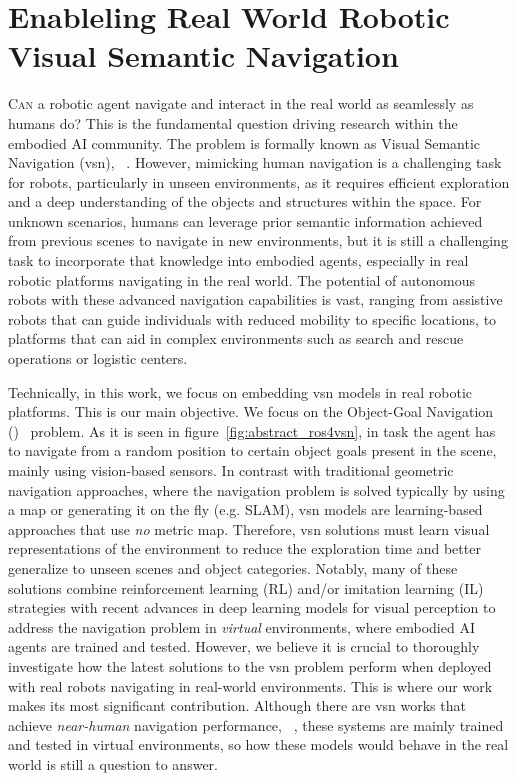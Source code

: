 \chapter{Enableling Real World Robotic Visual Semantic Navigation}\label{ch:ros4vsn:-enable-real-world-robotic-visual-semantic-navigation}

\lettrine{\textcolor{accent_color}{C}}{an} a robotic agent navigate and interact in the real world as seamlessly as humans do?
This is the fundamental question driving research within the embodied AI community.
The problem is formally known as Visual Semantic Navigation (\acrshort{vsn}), \eg~\cite{ramrakhya2023,Cai2024DGMemLV,chang2020}.
However, mimicking human navigation is a challenging task for robots, particularly in unseen environments, as it requires efficient exploration and a deep understanding of the objects and structures within the space.
For unknown scenarios, humans can leverage prior semantic information achieved from previous scenes to navigate in new environments, but it is still a challenging task to incorporate that knowledge into embodied agents, especially in real robotic platforms navigating in the real world.
The potential of autonomous robots with these advanced navigation capabilities is vast, ranging from assistive robots that can guide individuals with reduced mobility to specific locations, to platforms that can aid in complex environments such as search and rescue operations or logistic centers.

Technically, in this work, we focus on embedding \acrshort{vsn} models in real robotic platforms.
This is our main objective.
We focus on the Object-Goal Navigation (\objnav)~\cite{batra2020} problem.
As it is seen in figure~\ref{fig:abstract_ros4vsn}, in \objnav task the agent has to navigate from a random position to certain object goals present in the scene, mainly using vision-based sensors.
In contrast with traditional geometric navigation approaches, where the navigation problem is solved typically by using a map or generating it on the fly (e.g. SLAM), \acrshort{vsn} models are learning-based approaches that use \emph{no} metric map.
Therefore, \acrshort{vsn} solutions must learn visual representations of the environment to reduce the exploration time and better generalize to unseen scenes and object categories.
Notably, many of these solutions combine reinforcement learning (RL) and/or imitation learning (IL) strategies with recent advances in deep learning models for visual perception to address the navigation problem in \emph{virtual} environments, where embodied AI agents are trained and tested.
However, we believe it is crucial to thoroughly investigate how the latest solutions to the \acrshort{vsn} problem perform when deployed with real robots navigating in real-world environments.
This is where our work makes its most significant contribution.
Although there are \acrshort{vsn} works that achieve \textit{near-human} navigation performance, \eg~\cite{ramrakhya2023}, these systems are mainly trained and tested in virtual environments, so how these models would behave in the real world is still a question to answer.

